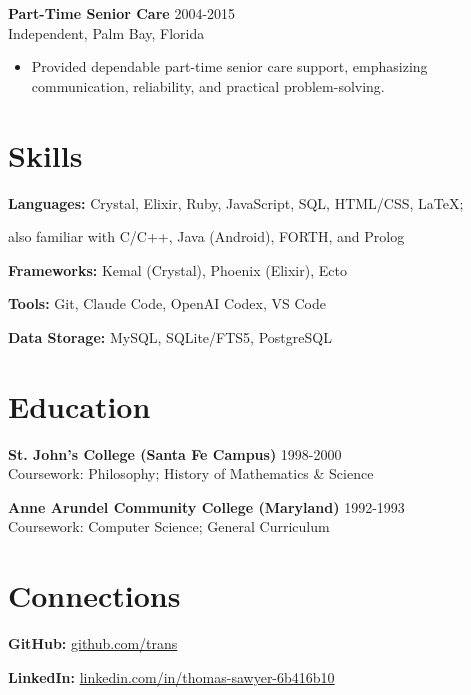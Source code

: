 \documentclass[11pt]{article}
\begin{document}
\vspace{6pt}
\textbf{Part-Time Senior Care} \hfill 2004-2015\\
Independent, Palm Bay, Florida
\vspace{2pt}
\begin{itemize}
  \item Provided dependable part-time senior care support, emphasizing communication, reliability, and practical problem-solving.
\end{itemize}

\section*{Skills}
\vspace{4pt}

\textbf{Languages:} Crystal, Elixir, Ruby, JavaScript, SQL, HTML/CSS, LaTeX;

\hspace{2.5cm} also familiar with C/C++, Java (Android), FORTH, and Prolog

\vspace{4pt}
\textbf{Frameworks:} Kemal (Crystal), Phoenix (Elixir), Ecto

\vspace{4pt}
\textbf{Tools:} Git, Claude Code, OpenAI Codex, VS Code

\vspace{4pt}
\textbf{Data Storage:} MySQL, SQLite/FTS5, PostgreSQL


\vspace{6pt}

\section*{Education}
\vspace{4pt}

\textbf{St. John's College (Santa Fe Campus)} \hfill {1998-2000}\\
Coursework: Philosophy; History of Mathematics \& Science

\vspace{4pt}
\textbf{Anne Arundel Community College (Maryland)} \hfill {1992-1993}\\
Coursework: Computer Science; General Curriculum

\vspace{6pt}

\section*{Connections}
\vspace{4pt}

\textbf{GitHub:} \href{https://github.com/trans}{github.com/trans}
\vspace{4pt}

\textbf{LinkedIn:} \href{https://www.linkedin.com/in/thomas-sawyer-6b416b10/}{linkedin.com/in/thomas-sawyer-6b416b10}\\
\end{document}
